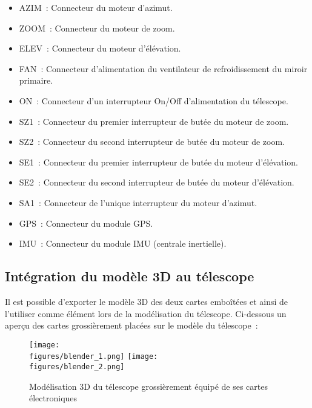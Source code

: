 \begin{itemize}[label=$\bullet$]
	\item AZIM~: Connecteur du moteur d'azimut.
	\item ZOOM~: Connecteur du moteur de zoom.
	\item ELEV~: Connecteur du moteur d'élévation.
	\item FAN~: Connecteur d'alimentation du ventilateur de refroidissement du miroir primaire.
	\item ON~: Connecteur d'un interrupteur On/Off d'alimentation du télescope.
	\item SZ1~: Connecteur du premier interrupteur de butée du moteur de zoom.
	\item SZ2~: Connecteur du second interrupteur de butée du moteur de zoom.
	\item SE1~: Connecteur du premier interrupteur de butée du moteur d'élévation.
	\item SE2~: Connecteur du second interrupteur de butée du moteur d'élévation.
	\item SA1~: Connecteur de l'unique interrupteur du moteur d'azimut.
	\item GPS~: Connecteur du module GPS.
	\item IMU~: Connecteur du module IMU (centrale inertielle).
	\end{itemize}

\subsection{Intégration du modèle 3D au télescope}

Il est possible d'exporter le modèle 3D des deux cartes emboîtées et ainsi de l'utiliser comme élément lors de la modélisation du télescope. Ci-dessous un aperçu des cartes grossièrement placées sur le modèle du télescope~:

\begin{figure}[H]
    \centering
    \texttt{[image: \\figures/blender\_1.png]}
    \texttt{[image: \\figures/blender\_2.png]}
    \decoRule
    \caption[
    Modélisation 3D du télescope grossièrement équipé de ses cartes électroniques]{
    Modélisation 3D du télescope grossièrement équipé de ses cartes électroniques}
    \label{fig:Modélisation 3D du télescope grossièrement équipé de ses cartes électroniques}
    \end{figure}
